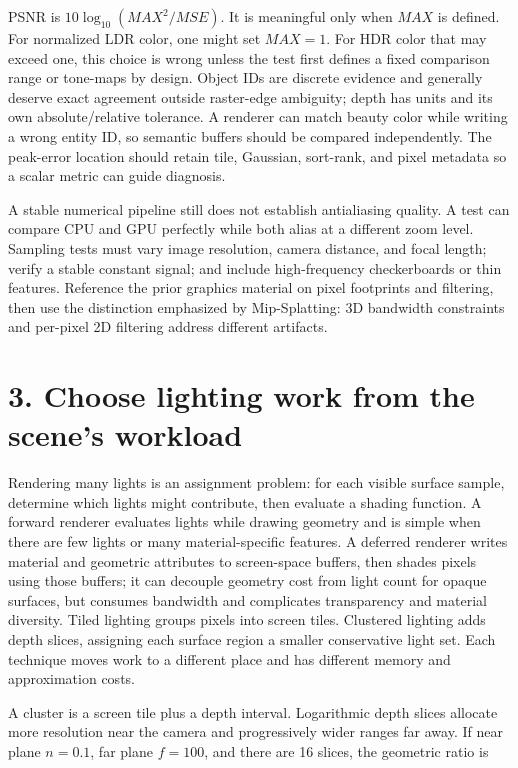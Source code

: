 PSNR is \(10\log_{10}(MAX^2/MSE)\). It is meaningful only when \(MAX\) is defined. For normalized LDR color, one might set \(MAX=1\). For HDR color that may exceed one, this choice is wrong unless the test first defines a fixed comparison range or tone-maps by design. Object IDs are discrete evidence and generally deserve exact agreement outside raster-edge ambiguity; depth has units and its own absolute/relative tolerance. A renderer can match beauty color while writing a wrong entity ID, so semantic buffers should be compared independently. The peak-error location should retain tile, Gaussian, sort-rank, and pixel metadata so a scalar metric can guide diagnosis.

A stable numerical pipeline still does not establish antialiasing quality. A test can compare CPU and GPU perfectly while both alias at a different zoom level. Sampling tests must vary image resolution, camera distance, and focal length; verify a stable constant signal; and include high-frequency checkerboards or thin features. Reference the prior graphics material on pixel footprints and filtering, then use the distinction emphasized by Mip-Splatting: 3D bandwidth constraints and per-pixel 2D filtering address different artifacts.

\section{3. Choose lighting work from the scene's workload}\label{04-visual-computing-ii-ch037-choose-lighting-work-from-the-scenes-workload}

Rendering many lights is an assignment problem: for each visible surface sample, determine which lights might contribute, then evaluate a shading function. A forward renderer evaluates lights while drawing geometry and is simple when there are few lights or many material-specific features. A deferred renderer writes material and geometric attributes to screen-space buffers, then shades pixels using those buffers; it can decouple geometry cost from light count for opaque surfaces, but consumes bandwidth and complicates transparency and material diversity. Tiled lighting groups pixels into screen tiles. Clustered lighting adds depth slices, assigning each surface region a smaller conservative light set. Each technique moves work to a different place and has different memory and approximation costs.

A cluster is a screen tile plus a depth interval. Logarithmic depth slices allocate more resolution near the camera and progressively wider ranges far away. If near plane \(n=0.1\), far plane \(f=100\), and there are 16 slices, the geometric ratio is

